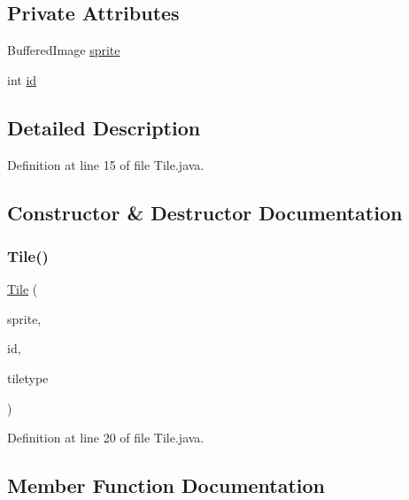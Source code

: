 \subsection*{Private Attributes}
\begin{DoxyCompactItemize}
\item 
Buffered\+Image \hyperlink{classblocchi_1_1_tile_a596d0c3eea54a08f78cbad0a4fbec565}{sprite}
\item 
int \hyperlink{classblocchi_1_1_tile_a7441ef0865bcb3db9b8064dd7375c1ea}{id}
\end{DoxyCompactItemize}


\subsection{Detailed Description}


Definition at line 15 of file Tile.\+java.



\subsection{Constructor \& Destructor Documentation}
\mbox{\label{classblocchi_1_1_tile_acbf8ab43b0cee998ab5f07f76d55fdee}} 
\subsubsection{\texorpdfstring{Tile()}{Tile()}}
{\footnotesize\ttfamily \hyperlink{classblocchi_1_1_tile}{Tile} (\begin{DoxyParamCaption}\item[{Buffered\+Image}]{sprite,  }\item[{int}]{id,  }\item[{int}]{tiletype }\end{DoxyParamCaption})}



Definition at line 20 of file Tile.\+java.



\subsection{Member Function Documentation}
\mbox{\label{classblocchi_1_1_tile_a67283be3f45257d1e0c474c563ebb6b6}} 

